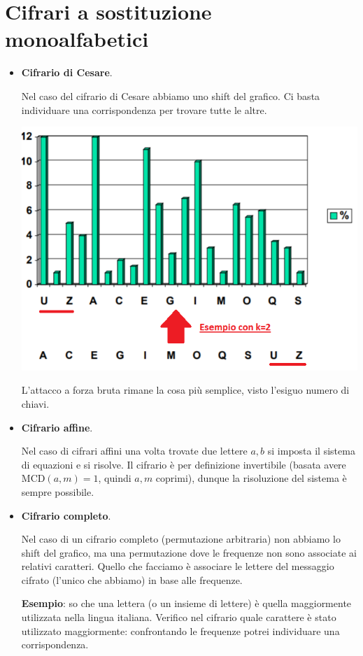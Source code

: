 \section{Cifrari a sostituzione monoalfabetici}
\begin{itemize}
	\item \textbf{Cifrario di Cesare}. 
	
	Nel caso del cifrario di Cesare abbiamo uno shift del grafico. Ci basta individuare una corrispondenza per trovare tutte le altre. 
	
	\begin{center}
		\includegraphics[scale=.55]{images/13bis.PNG}
	\end{center}

	L'attacco a forza bruta rimane la cosa più semplice, visto l'esiguo numero di chiavi. 
	
	\item \textbf{Cifrario affine}. 
	
	Nel caso di cifrari affini una volta trovate due lettere $a,b$ si imposta il sistema di equazioni e si risolve. Il cifrario è per definizione invertibile (basata avere $\text{MCD}(a,m)=1$, quindi $a,m$ coprimi), dunque la risoluzione del sistema è sempre possibile.
	\item \textbf{Cifrario completo}. 
	
	Nel caso di un cifrario completo (permutazione arbitraria) non abbiamo lo shift del grafico, ma una permutazione dove le frequenze non sono associate ai relativi caratteri. Quello che facciamo è associare le lettere del messaggio cifrato (l'unico che abbiamo) in base alle frequenze.
	
	\textbf{Esempio}: so che una lettera (o un insieme di lettere) è quella maggiormente utilizzata nella lingua italiana. Verifico nel cifrario quale carattere è stato utilizzato maggiormente: confrontando le frequenze potrei individuare una corrispondenza.
\end{itemize}
\clearpage 

